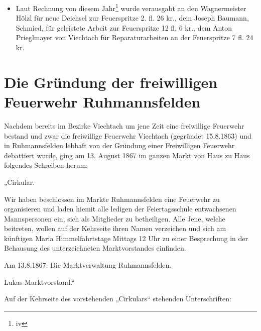 \documentclass[12pt,a4paper]{book}
\begin{document}
\begin{itemize}
\item Laut Rechnung von diesem Jahr\footnote{iv} wurde verausgabt an den
Wagnermeister Hölzl für neue Deichsel zur Feuerspritze 2. fl. 26 kr.,
dem Joseph Baumann, Schmied, für geleistete Arbeit zur Feuerspritze 12
fl. 6 kr., dem Anton Prieglmayer von Viechtach für Reparaturarbeiten an
der Feuerspritze 7 fl. 24 kr.
\end{itemize}

\chapter{Die Gründung der freiwilligen Feuerwehr Ruhmannsfelden}

Nachdem bereits im Bezirke Viechtach um jene Zeit eine freiwillige
Feuerwehr bestand und zwar die freiwillige Feuerwehr Viechtach
(gegründet 15.8.1863) und in Ruhmannsfelden lebhaft von der Gründung
einer Freiwilligen Feuerwehr debattiert wurde, ging am 13. August 1867
im ganzen Markt von Haus zu Haus folgendes Schreiben herum:

„Cirkular.

Wir haben beschlossen im Markte Ruhmannsfelden eine Feuerwehr zu
organisieren und laden hiemit alle ledigen der Feiertagsschule
entwachsenen Mannspersonen ein, sich als Mitglieder zu betheiligen. Alle
Jene, welche beitreten, wollen auf der Kehrseite ihren Namen verzeichen
und sich am künftigen Maria Himmelfahrtstage Mittags 12 Uhr zu einer
Besprechung in der Behausung des unterzeichneten Marktvorstandes
einfinden.

Am 13.8.1867. Die Marktverwaltung Ruhmannsfelden.

Lukas Marktvorstand.“

Auf der Kehrseite des vorstehenden „Cirkulars“ stehenden Unterschriften:
\end{document}
